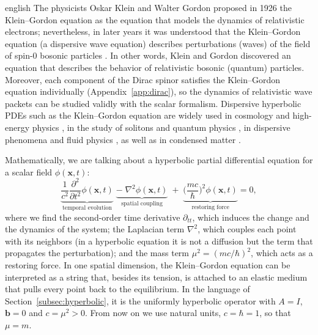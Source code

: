 \documentclass[0000.tex]{subfiles}
\begin{document}
\begin{hyphenrules}{english}
The physicists Oskar Klein and Walter Gordon proposed in 1926 the Klein--Gordon equation as the
equation that models the dynamics of relativistic electrons; nevertheless, in later years it was
understood that the Klein--Gordon equation (a dispersive wave equation) describes perturbations (waves)
of the field of spin-0 bosonic particles \cite{castro2018}. In other words, Klein and Gordon
discovered an equation that describes the behavior of relativistic bosonic (quantum) particles.
Moreover, each component of the Dirac spinor satisfies the Klein--Gordon equation individually
\cite{bjorken1964} (Appendix~\ref{app:dirac}), so the dynamics of relativistic wave packets can be studied
validly with the scalar formalism. Dispersive hyperbolic PDEs such as the Klein--Gordon equation are
widely used in cosmology and high-energy physics \cite{yagdjian2013}, in the study of solitons and
quantum physics \cite{madani2025}, in dispersive phenomena and fluid physics
\cite{miller2019}, as well as in condensed matter \cite{megias2022}.

Mathematically, we are talking about a hyperbolic partial differential equation for a scalar field
$\phi(\mathbf{x},t)$:
\begin{equation}
  \underbrace{\frac{1}{c^2}\frac{\partial^2}{\partial t^2}\phi(\mathbf{x},t)}_{\text{temporal evolution}}
  \;\underbrace{-\;\nabla^2\phi(\mathbf{x},t)}_{\text{spatial coupling}}
  \;+\;\underbrace{\Big(\frac{mc}{\hbar}\Big)^2\phi(\mathbf{x},t)}_{\text{restoring force}}=0,
  \label{eq:kg}
\end{equation}
where we find the second-order time derivative $\partial_{tt}$, which induces the change and the
dynamics of the system; the Laplacian term $\nabla^2$, which couples each point with its neighbors (in
a hyperbolic equation it is not a diffusion but the term that propagates the perturbation); and the
mass term $\mu^2=(mc/\hbar)^2$, which acts as a restoring force. In one spatial dimension, the
Klein--Gordon equation can be interpreted as a string that, besides its tension, is attached to an
elastic medium that pulls every point back to the equilibrium. In the language of
Section~\ref{subsec:hyperbolic}, it is the uniformly hyperbolic operator with $A=I$, $\mathbf{b}=0$ and $c=\mu^2>0$.
From now on we use natural units, $c=\hbar=1$, so that $\mu=m$.


\end{hyphenrules}
\end{document}

